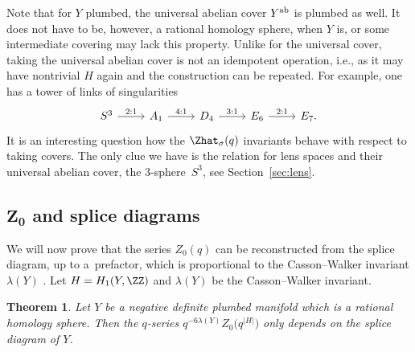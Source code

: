 \documentclass[pdftex]{sigma}
\newtheorem{Theorem}{Theorem}[section]
\begin{document}
Note that for $Y$ plumbed, the universal abelian cover $Y^{\rm ab}$ is plumbed as well. It does not have to be, however, a rational homology sphere, when $Y$ is, or some intermediate covering may lack this property. Unlike for the universal cover, taking the universal abelian cover is not an idempotent operation, i.e., as it may have nontrivial $H$ again and the construction can be repeated. For example, one has a tower of links of singularities
	\[
		\begin{tikzcd}
			S^3 \arrow[r, "{2:1}"] & A_1 \arrow[r, "{4:1}"] & D_4 \arrow[r, "{3:1}"] & E_6 \arrow[r, "{2:1}"] & E_7.
		\end{tikzcd}
	\]
It is an interesting question how the $\Zhat_\sigma(q)$ invariants behave with respect to taking covers. The only clue we have is the relation for lens spaces and their universal abelian cover, the 3-sphere~$S^3$, see Section~\ref{sec:lens}.

\subsection[Z_0 and splice diagrams]{$\boldsymbol{Z_0}$ and splice diagrams}

We will now prove that the series $Z_0(q)$ can be reconstructed from the splice diagram, up to a~prefactor, which is proportional to the Casson--Walker invariant $\lambda(Y)$ \cite{Wa92}. Let $H = H_1(Y, \ZZ)$ and $\lambda(Y)$ be the Casson--Walker invariant.
%
\begin{Theorem}\label{thm:plumbing}
	Let $Y$ be a negative definite plumbed manifold which is a rational homology sphere. Then the $q$-series
$
		q^{-6 \lambda(Y)} Z_{0}\bigl(q^{|H|}\bigr)
$
	only depends on the splice diagram of $Y$.
\end{Theorem}
\end{document}
